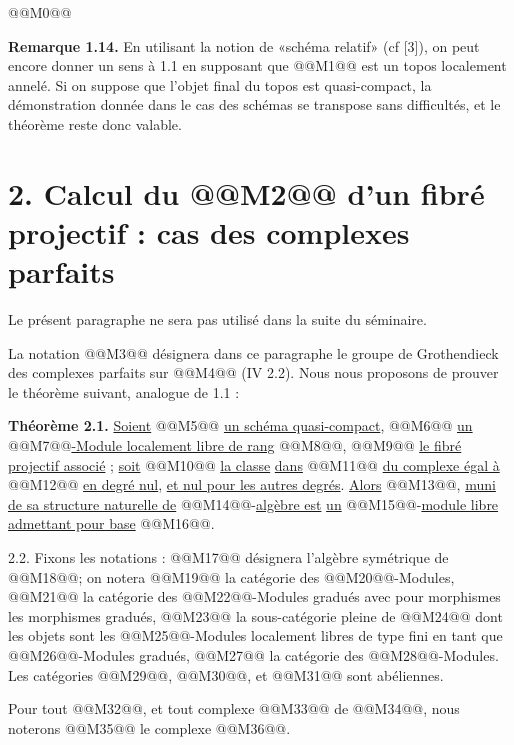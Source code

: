 
@@M0@@

\textbf{Remarque 1.14.} En utilisant la notion de «schéma relatif» (cf [3]), on peut encore donner un sens à 1.1 en supposant que @@M1@@ est un topos localement annelé. Si on suppose que l'objet final du topos est quasi-compact, la démonstration donnée dans le cas des schémas se transpose sans difficultés, et le théorème reste donc valable.

\section*{2. Calcul du @@M2@@ d'un fibré projectif : cas des complexes parfaits}


Le présent paragraphe ne sera pas utilisé dans la suite du séminaire.

La notation @@M3@@ désignera dans ce paragraphe le groupe de Grothendieck des complexes parfaits sur @@M4@@ (IV 2.2). Nous nous proposons de prouver le théorème suivant, analogue de 1.1 :

\textbf{Théorème 2.1.} \uline{Soient} @@M5@@ \uline{un schéma quasi-compact}, @@M6@@ \uline{un} @@M7@@\uline{-Module localement libre de rang} @@M8@@, @@M9@@ \uline{le fibré projectif associé} ; \uline{soit} @@M10@@ \uline{la classe} \uline{dans} @@M11@@ \uline{du complexe égal à} @@M12@@ \uline{en degré nul}, \uline{et nul pour les autres degrés}. \uline{Alors} @@M13@@, \uline{muni de sa structure naturelle de} @@M14@@-\uline{algèbre est} \uline{un} @@M15@@-\uline{module libre admettant pour base} @@M16@@.

2.2. Fixons les notations : @@M17@@ désignera l'algèbre symétrique de @@M18@@; on notera @@M19@@ la catégorie des @@M20@@-Modules, @@M21@@ la catégorie des @@M22@@-Modules gradués avec pour morphismes les morphismes gradués, @@M23@@ la sous-catégorie pleine de @@M24@@ dont les objets sont les @@M25@@-Modules localement libres de type fini en tant que @@M26@@-Modules gradués, @@M27@@ la catégorie des @@M28@@-Modules. Les catégories @@M29@@, @@M30@@, et @@M31@@ sont abéliennes.

Pour tout @@M32@@, et tout complexe @@M33@@ de @@M34@@, nous noterons @@M35@@ le complexe @@M36@@.

